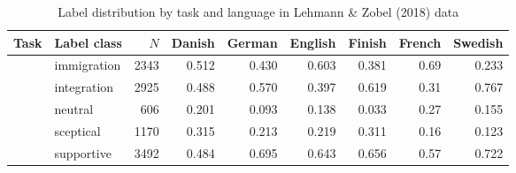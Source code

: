 \begin{table}[!t]

\caption{\label{tab:label_distribution_by_lang_lehmann+zobel_2018}Label distribution by task and language in Lehmann \& Zobel (2018) data}
\centering
\fontsize{10}{12}\selectfont
\begin{tabular}[t]{>{\raggedright\arraybackslash}L{1.5in}lrrrrrrr}
\toprule
\headrow Task & Label class & $N$ & Danish & German & English & Finish & French & Swedish\\
\midrule
 & immigration & 2343 & 0.512 & 0.430 & 0.603 & 0.381 & 0.69 & 0.233\\

 & integration & 2925 & 0.488 & 0.570 & 0.397 & 0.619 & 0.31 & 0.767\\
 & neutral & 606 & 0.201 & 0.093 & 0.138 & 0.033 & 0.27 & 0.155\\

 & sceptical & 1170 & 0.315 & 0.213 & 0.219 & 0.311 & 0.16 & 0.123\\

 & supportive & 3492 & 0.484 & 0.695 & 0.643 & 0.656 & 0.57 & 0.722\\
\bottomrule
\end{tabular}
\end{table}
